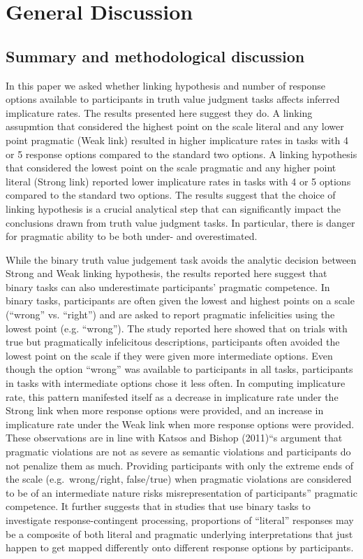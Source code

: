 \documentclass[man]{apa6}
\theoremstyle{definition}
\theoremstyle{definition}
\theoremstyle{definition}
\theoremstyle{remark}
\begin{document}
\section{General Discussion}\label{general-discussion}

\subsection{Summary and methodological
discussion}\label{summary-and-methodological-discussion}

In this paper we asked whether linking hypothesis and number of
response options available to participants in truth value judgment tasks
affects inferred implicature rates. The results presented here suggest
they do. A linking assupmtion that considered the highest point on the
scale literal and any lower point pragmatic (Weak link) resulted in
higher implicature rates in tasks with 4 or 5 response options compared
to the standard two options. A linking hypothesis that considered the
lowest point on the scale pragmatic and any higher point literal (Strong
link) reported lower implicature rates in tasks with 4 or 5 options
compared to the standard two options. The results suggest that the
choice of linking hypothesis is a crucial analytical step that can
significantly impact the conclusions drawn from truth value judgment
tasks. In particular, there is danger for pragmatic ability to be both
under- and overestimated.

While the binary truth value judgement task avoids the analytic decision
between Strong and Weak linking hypothesis, the results reported here
suggest that binary tasks can also underestimate participants' pragmatic
competence. In binary tasks, participants are often given the lowest and
highest points on a scale (\enquote{wrong} vs. \enquote{right}) and are
asked to report pragmatic infelicities using the lowest point (e.g.
\enquote{wrong}). The study reported here showed that on trials with
true but pragmatically infelicitous descriptions, participants often
avoided the lowest point on the scale if they were given more
intermediate options. Even though the option \enquote{wrong} was
available to participants in all tasks, participants in tasks with
intermediate options chose it less often. In computing implicature rate,
this pattern manifested itself as a decrease in implicature rate under
the Strong link when more response options were provided, and an
increase in implicature rate under the Weak link when more response
options were provided. These observations are in line with Katsos and
Bishop (2011)\enquote{s argument that pragmatic violations are not as
severe as semantic violations and participants do not penalize them as
much. Providing participants with only the extreme ends of the scale
(e.g.~wrong/right, false/true) when pragmatic violations are considered
to be of an intermediate nature risks misrepresentation of participants}
pragmatic competence. It further suggests that in studies that use
binary tasks to investigate response-contingent processing, proportions
of \enquote{literal} responses may be a composite of both literal and
pragmatic underlying interpretations that just happen to get mapped
differently onto different response options by participants.
\end{document}
